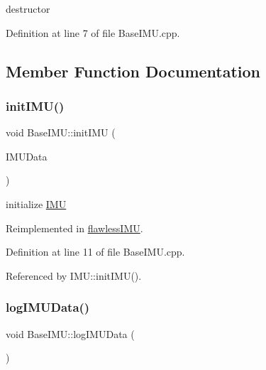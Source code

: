 destructor 



Definition at line 7 of file Base\+I\+M\+U.\+cpp.



\subsection{Member Function Documentation}
\mbox{\label{class_base_i_m_u_ade02045afd03f290ac1e702db9e1d5a7}} 
\subsubsection{\texorpdfstring{init\+I\+M\+U()}{initIMU()}}
{\footnotesize\ttfamily void Base\+I\+M\+U\+::init\+I\+MU (\begin{DoxyParamCaption}\item[{I\+M\+U\+Struct \&}]{I\+M\+U\+Data }\end{DoxyParamCaption})\hspace{0.3cm}{\ttfamily [virtual]}}



initialize \hyperlink{class_i_m_u}{I\+MU} 



Reimplemented in \hyperlink{classflawless_i_m_u_a7dd4d315fa319eef68987b17fb636c43}{flawless\+I\+MU}.



Definition at line 11 of file Base\+I\+M\+U.\+cpp.



Referenced by I\+M\+U\+::init\+I\+M\+U().

\mbox{\label{class_base_i_m_u_a8f323eb821f92300af5047ed9c66b116}} 
\subsubsection{\texorpdfstring{log\+I\+M\+U\+Data()}{logIMUData()}}
{\footnotesize\ttfamily void Base\+I\+M\+U\+::log\+I\+M\+U\+Data (\begin{DoxyParamCaption}{ }\end{DoxyParamCaption})\hspace{0.3cm}{\ttfamily [virtual]}}




